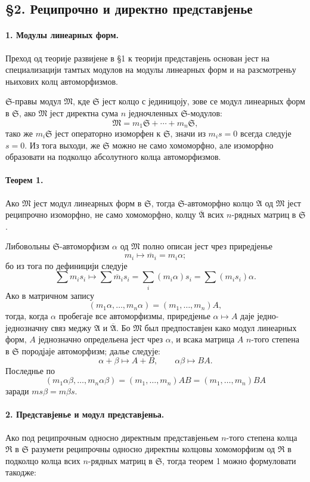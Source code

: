 ﻿\documentclass[11pt]{article}
\providecommand{\frM}{\mathfrak M}
\providecommand{\frR}{\mathfrak R}
\providecommand{\frS}{\mathfrak S}
\providecommand{\mA}{\mathfrak A}
\providecommand{\mbarA}{\overline{\mathfrak A}}
\begin{document}
\subsection*{§2. Реципрочно и директно представјенье}

\paragraph{1. Модулы линеарных форм.}
Преход од теорије развијене в §1 к теорији представјень основан јест на специализацији тамтых модулов на модулы линеарных форм и на разсмотреньу ньихових колц автоморфизмов.

\(\frS\)-правы модул \(\frM\), кде \(\frS\) јест колцо с јединицоју, зове се модул линеарных форм в \(\frS\), ако \(\frM\) јест директна сума \(n\) једночленных \(\frS\)-модулов:
\[
        \frM=m_1\frS+\cdots+m_n\frS,
\]
тако же \(m_i\frS\) јест операторно изоморфен к \(\frS\), значи из \(m_i s=0\) всегда следује \(s=0\). Из тога выходи, же \(\frS\) можно не само хомоморфно, але изоморфно образовати на подколцо абсолутного колца автоморфизмов.

\paragraph{Теорем 1.}
Ако \(\frM\) јест модул линеарных форм в \(\frS\), тогда \(\frS\)-автоморфно колцо \(\mA\) од \(\frM\) јест реципрочно изоморфно, не само хомоморфно, колцу \(\mbarA\) всих \(n\)-рядных матриц в \(\frS\).

Либовольны \(\frS\)-автоморфизм \(\alpha\) од \(\frM\) полно описан јест чрез приредјенье
\[
        m_i\longmapsto \overline m_i=m_i\alpha;
\]
бо из тога по дефиницији следује
\[
        \sum m_i s_i\longmapsto
        \sum \overline m_i s_i
        =\sum_i (m_i\alpha)s_i
        =\sum (m_i s_i)\alpha.
\]
Ако в матричном запису
\[
        (m_1\alpha,\ldots,m_n\alpha)=(m_1,\ldots,m_n)A,
\]
тогда, когда \(\alpha\) пробегаје все автоморфизмы, приредјенье \(\alpha\mapsto A\) даје једно-једнозначну связ меджу \(\mA\) и \(\mbarA\). Бо \(\frM\) был предпоставјен како модул линеарных форм, \(A\) једнозначно определьена јест чрез \(\alpha\), и всака матрица \(A\) \(n\)-того степена в \(\frS\) породјаје автоморфизм; далье следује:
\[
        \alpha+\beta\mapsto A+B,\qquad
        \alpha\beta\mapsto BA.
\]
Последнье по
\[
        (m_1\alpha\beta,\ldots,m_n\alpha\beta)
        =(m_1,\ldots,m_n)AB
        =(m_1,\ldots,m_n)BA
\]
заради \(ms\beta=m\beta s\).

\paragraph{2. Представјенье и модул представјеньа.}
Ако под реципрочным односно директным представјеньем \(n\)-того степена колца \(\frR\) в \(\frS\) разумети реципрочны односно директны колцовы хомоморфизм од \(\frR\) в подколцо колца всих \(n\)-рядных матриц в \(\frS\), тогда теорем 1 можно формуловати такодже:
\end{document}
